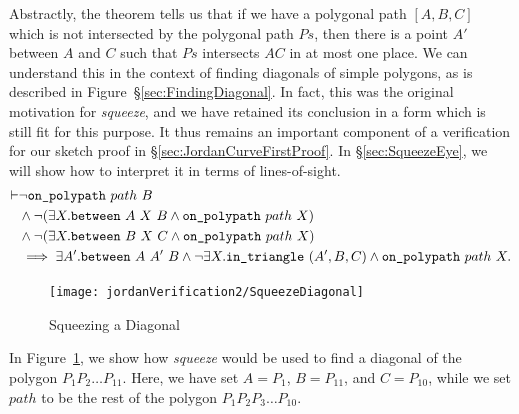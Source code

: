 Abstractly, the theorem tells us that if we have a polygonal path $[A,B,C]$ which is not intersected by the polygonal path $Ps$, then there is a point $A'$ between $A$ and $C$ such that $Ps$ intersects $AC$ in at most one place. We can understand this in the context of finding diagonals of simple polygons, as is described in Figure~\S\ref{sec:FindingDiagonal}. In fact, this was the original motivation for \emph{squeeze}, and we have retained its conclusion in a form which is still fit for this purpose. It thus remains an important component of a verification for our sketch proof in \S\ref{sec:JordanCurveFirstProof}. In \S\ref{sec:SqueezeEye}, we will show how to interpret it in terms of lines-of-sight.
\begin{equation}\label{eq:Squeeze}
  \begin{aligned}
    \vdash&\neg\texttt{on\_polypath}\ path\ B\\
    &\wedge \neg(\exists X. \texttt{between}\ A\ X\ B \wedge \texttt{on\_polypath}\ path\ X)\\
    &\wedge \neg(\exists X. \texttt{between}\ B\ X\ C \wedge \texttt{on\_polypath}\ path\ X)\\
    &\implies \exists A'. \texttt{between}\ A\ A'\ B \wedge \neg\exists X. \texttt{in\_triangle}\ (A',B,C) \wedge \texttt{on\_polypath}\ path\ X.
  \end{aligned}
\end{equation}

\begin{figure}
\centering\texttt{[image: jordanVerification2/SqueezeDiagonal]}
\caption{Squeezing a Diagonal}
\label{fig:SqueezeDiagonal}
\end{figure}

In Figure~\ref{fig:SqueezeDiagonal}, we show how \emph{squeeze} would be used to find a diagonal of the polygon $P_1P_2\ldots P_{11}$. Here, we have set $A = P_1$, $B = P_{11}$, and $C = P_{10}$, while we set $path$ to be the rest of the polygon $P_1P_2P_3\ldots P_{10}$. 

